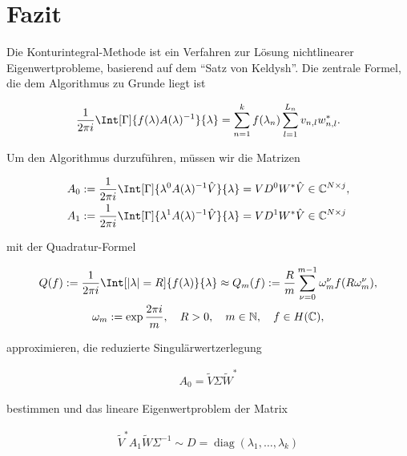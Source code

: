 \chapter{Fazit}

Die Konturintegral-Methode ist ein Verfahren zur Lösung nichtlinearer Eigenwertprobleme, basierend auf dem \enquote{Satz von Keldysh}.
Die zentrale Formel, die dem Algorithmus zu Grunde liegt ist

\begin{gather*}
    \frac{1}{2 \pi i}
    \Int[\Gamma]{f(\lambda) A(\lambda)^{-1}}{\lambda}
    =
    \sum_{n=1}^k
        f(\lambda_n)
        \sum_{l=1}^{L_n}
            v_{n, l} w_{n, l}^\ast.
\end{gather*}

Um den Algorithmus durzuführen, müssen wir die Matrizen

\begin{align*}
    A_0
    & :=
    \frac{1}{2 \pi i}
    \Int[\Gamma]{\lambda^0 A(\lambda)^{-1} \hat V}{\lambda}
    =
    V D^0 W^\ast \hat V
    \in
    \C^{N \times j}, \\
    A_1
    & :=
    \frac{1}{2 \pi i}
    \Int[\Gamma]{\lambda^1 A(\lambda)^{-1} \hat V}{\lambda}
    =
    V D^1 W^\ast \hat V
    \in
    \C^{N \times j}
\end{align*}

mit der Quadratur-Formel

\begin{gather*}
    Q(f)
    :=
    \frac{1}{2 \pi i}
    \Int[|\lambda| = R]{f(\lambda)}{\lambda}
    \approx
    Q_m(f)
    :=
    \frac{R}{m}
    \sum_{\nu = 0}^{m-1}
        \omega_m^\nu f(R \omega_m^\nu), \\
    \omega_m
    :=
    \exp \frac{2 \pi i}{m},
    \quad
    R > 0,
    \quad
    m \in \N,
    \quad
    f \in H(\C),
\end{gather*}

approximieren, die reduzierte Singulärwertzerlegung

\begin{align*}
    A_0
    =
    \tilde V \Sigma \tilde W^\ast
\end{align*}

bestimmen und das lineare Eigenwertproblem der Matrix

\begin{align*}
    \tilde V^\ast A_1 \tilde W \Sigma^{-1}
    \sim
    D
    =
    \operatorname{diag}(\lambda_1, \dots, \lambda_k)
\end{align*}

